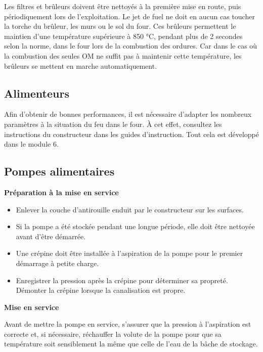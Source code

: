 Les filtres et brûleurs doivent être nettoyés à la première mise en route, puis périodiquement lors de l’exploitation. Le jet de fuel ne doit en aucun cas toucher la torche du brûleur, les murs ou le sol du four.
Ces brûleurs permettent le maintien d’une température supérieure à 850 °C, pendant plus de 2 secondes selon la norme, dans le four lors de la combustion des ordures. Car dans le cas où la combustion des seules OM ne suffit pas à maintenir cette température, les brûleurs se mettent en marche automatiquement.

\subsection{Alimenteurs} 

Afin d’obtenir de bonnes performances, il est nécessaire d’adapter les nombreux paramètres à la situation du feu dans le four. À cet effet, consultez les instructions du constructeur dans les guides d’instruction. Tout cela est développé dans le module 6.

\subsection{Pompes alimentaires}

\vspace{0.3cm}
\textbf{Préparation à la mise en service}
\vspace{0.3cm}

\begin{itemize}
\item  Enlever la couche d’antirouille enduit par le constructeur sur les surfaces.
\item  Si la pompe a été stockée pendant une longue période, elle doit être nettoyée avant d’être démarrée.
\item  Une crépine doit être installée à l’aspiration de la pompe pour le premier démarrage à petite charge.
\item  Enregistrer la pression après la crépine pour déterminer sa propreté. Démonter la crépine lorsque la canalisation est propre.

\end{itemize}

\vspace{0.3cm}
\textbf{Mise en service}
\vspace{0.3cm}


Avant de mettre la pompe en service, s’assurer que la pression à l’aspiration est correcte et, si nécessaire, réchauffer la volute de la pompe pour que sa température soit sensiblement la même que celle de l’eau de la bâche de stockage.
\vspace{0.3cm}

